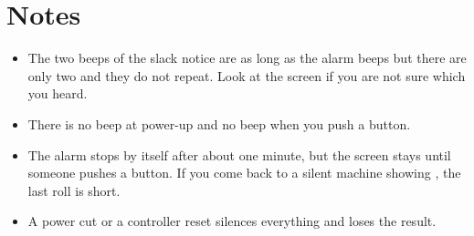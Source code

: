 \section*{Notes}
\begin{itemize}
  \item The two beeps of the slack notice are as long as the alarm beeps but
        there are only two and they do not repeat. Look at the screen if you
        are not sure which you heard.
  \item There is no beep at power-up and no beep when you push a button.
  \item The alarm stops by itself after about one minute, but the
         screen stays until someone pushes a button. If
        you come back to a silent machine showing , the
        last roll is short.
  \item A power cut or a controller reset silences everything and loses the
        result.
\end{itemize}
